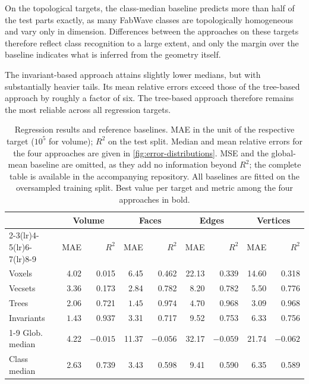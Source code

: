 \documentclass[5p,times,procedia]{elsarticle}
\begin{document}
On the topological targets, the class-median baseline predicts more than half of the test parts exactly, as many FabWave classes are topologically homogeneous and vary only in dimension. Differences between the approaches on these targets therefore reflect class recognition to a large extent, and only the margin over the baseline indicates what is inferred from the geometry itself.

The \mbox{invariant-based} approach attains slightly lower medians, but with substantially heavier tails. Its mean relative errors exceed those of the \mbox{tree-based} approach by roughly a factor of six. The \mbox{tree-based} approach therefore remains the most reliable across all regression targets.

\begin{table}[t]
\centering
\caption{Regression results and reference baselines. MAE in the unit of the
respective target ($10^{5}$ for volume); $R^2$ on the test split. Median and
mean relative errors for the four approaches are given in \cref{fig:error-distributions}.
MSE and the global-mean baseline are omitted, as they add no information beyond
$R^2$; the complete table is available in the accompanying repository. All
baselines are fitted on the oversampled training split. Best value per target
and metric among the four approaches in bold.}
\label{tab:regression}
\setlength{\tabcolsep}{3pt}
\scriptsize
\begin{tabular}{lrrrrrrrr}
\toprule
& \multicolumn{2}{c}{Volume} & \multicolumn{2}{c}{Faces}
& \multicolumn{2}{c}{Edges} & \multicolumn{2}{c}{Vertices} \\
\cmidrule(lr){2-3}\cmidrule(lr){4-5}\cmidrule(lr){6-7}\cmidrule(lr){8-9}
& MAE & $R^2$ & MAE & $R^2$ & MAE & $R^2$ & MAE & $R^2$ \\
\midrule
Voxels        & 4.02 & 0.015 & 6.45 & 0.462 & 22.13 & 0.339 & 14.60 & 0.318 \\
Vecsets       & 3.36 & 0.173 & 2.84 & 0.782 & 8.20  & 0.782 & 5.50  & 0.776 \\
Trees         & 2.06 & 0.721 & $\mathbf{1.45}$ & $\mathbf{0.974}$
              & $\mathbf{4.70}$ & $\mathbf{0.968}$ & $\mathbf{3.09}$ & $\mathbf{0.968}$ \\
Invariants    & $\mathbf{1.43}$ & $\mathbf{0.937}$ & 3.31 & 0.717
              & 9.52 & 0.753 & 6.33 & 0.756 \\
\cmidrule(l){1-9}
Glob. median  & 4.22 & $-0.015$ & 11.37 & $-0.056$ & 32.17 & $-0.059$ & 21.74 & $-0.062$ \\
Class median  & 2.63 & 0.739    & 3.43  & 0.598    & 9.41  & 0.590    & 6.35  & 0.589 \\
\bottomrule
\end{tabular}
\end{table}
\end{document}
